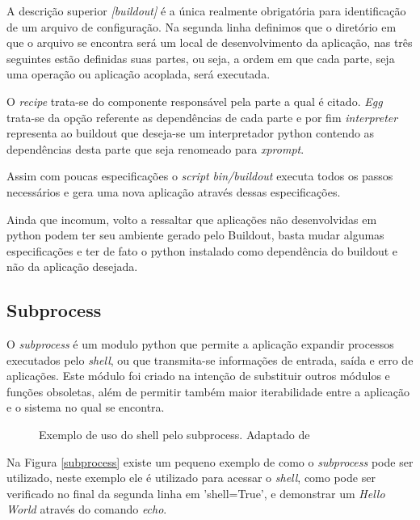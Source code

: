 A descrição superior \textit{[buildout]} é a única realmente obrigatória para identificação de um arquivo de configuração. Na segunda linha definimos que o diretório em que o arquivo se encontra será um local de desenvolvimento da aplicação, nas três seguintes estão definidas suas partes, ou seja, a ordem em que cada parte, seja uma operação ou aplicação acoplada, será executada.

O \textit{recipe} trata-se do componente responsável pela parte a qual é citado. \textit{Egg} trata-se da opção referente as dependências de cada parte e por fim \textit{interpreter} representa ao buildout que deseja-se um interpretador python contendo as dependências desta parte que seja renomeado para \textit{xprompt}.

Assim com poucas especificações o \textit{script} \textit{bin/buildout} executa todos os passos necessários e gera uma nova aplicação através dessas especificações.

Ainda que incomum, volto a ressaltar que aplicações não desenvolvidas em python podem ter seu ambiente gerado pelo Buildout, basta mudar algumas especificações e ter de fato o python instalado como dependência do buildout e não da aplicação desejada.

\subsection{Subprocess}

O \textit{subprocess} é um modulo python que permite a aplicação expandir processos executados pelo \textit{shell}, ou que transmita-se informações de entrada, saída e erro de aplicações. Este módulo foi criado na intenção de substituir outros módulos e funções obsoletas, além de permitir também maior iterabilidade entre a aplicação e o sistema no qual se encontra.

\begin{figure}[ht]
    \centering
    \caption{Exemplo de uso do shell pelo subprocess. Adaptado de \cite{GADNER-SUBPROCESS}}
    \label{Subprocess}
\end{figure}

Na Figura \ref{subprocess} existe um pequeno exemplo de como o \textit{subprocess} pode ser utilizado, neste exemplo ele é utilizado para acessar o \textit{shell}, como pode ser verificado no final da segunda linha em 'shell=True', e demonstrar um \textit{Hello World} através do comando \textit{echo}.

